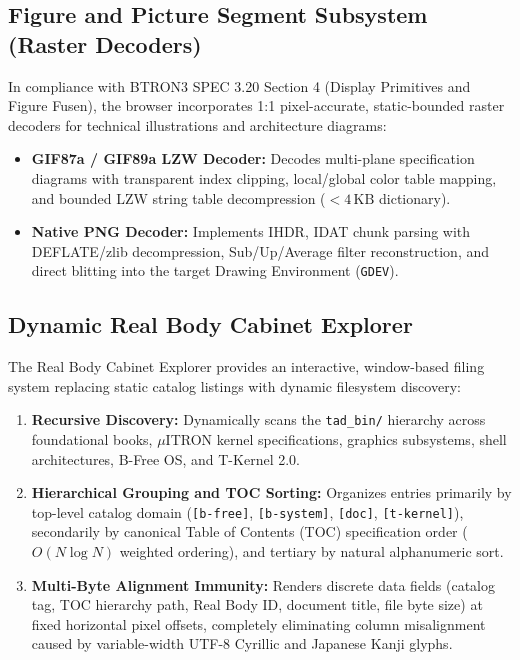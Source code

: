 \documentclass[10pt,journal,compsoc,twocolumn]{article}
\begin{document}
\subsection{Figure and Picture Segment Subsystem (Raster Decoders)}
In compliance with BTRON3 SPEC 3.20 Section 4 (Display Primitives and Figure Fusen), the browser incorporates 1:1 pixel-accurate, static-bounded raster decoders for technical illustrations and architecture diagrams:
\begin{itemize}[leftmargin=*]
    \item \textbf{GIF87a / GIF89a LZW Decoder:} Decodes multi-plane specification diagrams with transparent index clipping, local/global color table mapping, and bounded LZW string table decompression ($< 4\,\text{KB}$ dictionary).
    \item \textbf{Native PNG Decoder:} Implements IHDR, IDAT chunk parsing with DEFLATE/zlib decompression, Sub/Up/Average filter reconstruction, and direct blitting into the target Drawing Environment (\texttt{GDEV}).
\end{itemize}

\subsection{Dynamic Real Body Cabinet Explorer}
The Real Body Cabinet Explorer provides an interactive, window-based filing system replacing static catalog listings with dynamic filesystem discovery:
\begin{enumerate}[leftmargin=*]
    \item \textbf{Recursive Discovery:} Dynamically scans the \texttt{tad\_bin/} hierarchy across foundational books, $\mu$ITRON kernel specifications, graphics subsystems, shell architectures, B-Free OS, and T-Kernel 2.0.
    \item \textbf{Hierarchical Grouping and TOC Sorting:} Organizes entries primarily by top-level catalog domain (\texttt{[b-free]}, \texttt{[b-system]}, \texttt{[doc]}, \texttt{[t-kernel]}), secondarily by canonical Table of Contents (TOC) specification order ($O(N \log N)$ weighted ordering), and tertiary by natural alphanumeric sort.
    \item \textbf{Multi-Byte Alignment Immunity:} Renders discrete data fields (catalog tag, TOC hierarchy path, Real Body ID, document title, file byte size) at fixed horizontal pixel offsets, completely eliminating column misalignment caused by variable-width UTF-8 Cyrillic and Japanese Kanji glyphs.
\end{enumerate}
\end{document}
